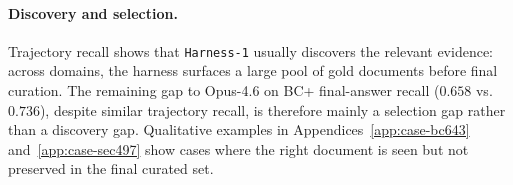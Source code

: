 \documentclass{article}
\newcommand{\sys}{\texttt{Harness-1}\xspace}
\newcommand{\verify}{\texttt{verify}\xspace}
\begin{document}

\paragraph{Discovery and selection.}
Trajectory recall shows that \sys usually discovers the relevant
evidence: across domains, the harness surfaces a large pool of gold
documents before final curation. The remaining gap to Opus-4.6 on BC+
final-answer recall ($0.658$ vs.\ $0.736$), despite similar trajectory
recall, is therefore mainly a selection gap rather than a discovery gap.
Qualitative examples in Appendices~\ref{app:case-bc643}
and~\ref{app:case-sec497} show cases where the right document is seen
but not preserved in the final curated set.



\end{document}
